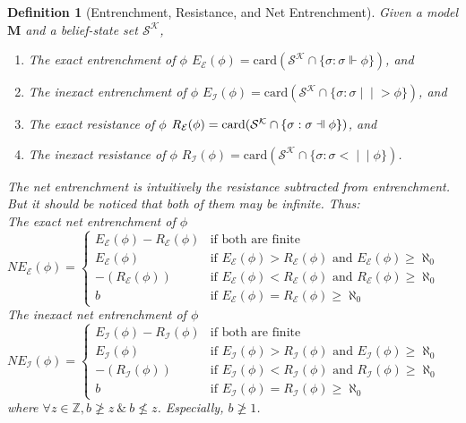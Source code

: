\documentclass[12pt]{article}
\newtheorem{definition}{Definition}[section]
\newcommand{\fal}{\mathrel{\text{\reflectbox{$\Vdash$}}}}
\newcommand{\ver}{\Vdash}
\newcommand{\inever}{\mid \! \mid \!\!>}
\newcommand{\inefal}{< \! \! \mid \! \mid}
\newcommand{\SK}{\mathcal{S}^\mathcal{K}}
\begin{document}
\begin{definition}[Entrenchment, Resistance, and Net Entrenchment] Given a model $\bm{M}$ and a belief-state set $\SK$, \par
    \begin{enumerate}
        \item[\emph{($E_\mathcal{E}$)}] The exact entrenchment of $\phi$ $E_\mathcal{E}(\phi) = \text{card}(\SK \cap \{\sigma: \sigma \ver \phi\})$, and 
        \item[\emph{($E_\mathcal{I}$)}] The inexact entrenchment of $\phi$ $E_\mathcal{I}(\phi) = \text{card}(\SK \cap \{\sigma: \sigma \inever \phi\})$, and
        \item[\emph{($R_\mathcal{E}$)}] The exact resistance of $\phi$ $R_\mathcal{E}(\phi) = \text{card}(\SK \cap \{\sigma: \sigma \fal \phi\})$, and 
        \item[\emph{($R_\mathcal{I}$)}] The inexact resistance of $\phi$ $R_\mathcal{I}(\phi) = \text{card}(\SK \cap \{\sigma: \sigma \inefal \phi\})$.
    \end{enumerate}
    The net entrenchment is intuitively the resistance subtracted from entrenchment. But it should be noticed that both of them may be infinite. Thus: \\
    The exact net entrenchment of $\phi$ $NE_\mathcal{E}(\phi) =  \begin{cases}  E_\mathcal{E}(\phi) - R_\mathcal{E}(\phi) & \text{if both are finite} \\ 
        E_\mathcal{E}(\phi) & \text{if } E_\mathcal{E}(\phi) > R_\mathcal{E}(\phi) \text{ and } E_\mathcal{E}(\phi) \ge \aleph_0\\ 
        - (R_\mathcal{E}(\phi)) & \text{if } E_\mathcal{E}(\phi) < R_\mathcal{E}(\phi) \text{ and } R_\mathcal{E}(\phi) \ge \aleph_0\\ 
        b & \text{if } E_\mathcal{E}(\phi) = R_\mathcal{E}(\phi) \ge \aleph_0 
    \end{cases}$
    The inexact net entrenchment of $\phi$ $NE_\mathcal{I}(\phi) =  \begin{cases}  E_\mathcal{I}(\phi) - R_\mathcal{I}(\phi) & \text{if both are finite} \\ 
        E_\mathcal{I}(\phi) & \text{if } E_\mathcal{I}(\phi) > R_\mathcal{I}(\phi) \text{ and } E_\mathcal{I}(\phi) \ge \aleph_0\\ 
        - (R_\mathcal{I}(\phi)) & \text{if } E_\mathcal{I}(\phi) < R_\mathcal{I}(\phi) \text{ and } R_\mathcal{I}(\phi) \ge \aleph_0\\ 
        b & \text{if } E_\mathcal{I}(\phi) = R_\mathcal{I}(\phi) \ge \aleph_0 
    \end{cases}$
    where $\forall z \in \mathbb{Z}, b \ngeq z \ \& \ b \nleq z$. Especially, $b \ngeq 1$. 
\end{definition}
\end{document}
